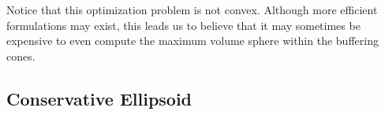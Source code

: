 % 
% 
% 
% 
% 
% 
% 

Notice that this optimization problem is not convex.
Although more efficient formulations may exist, this leads us to believe that it may sometimes be expensive
to even compute the maximum volume sphere within the buffering cones.

\subsection{Conservative Ellipsoid}
\label{the_conservative_ellipsoid}

